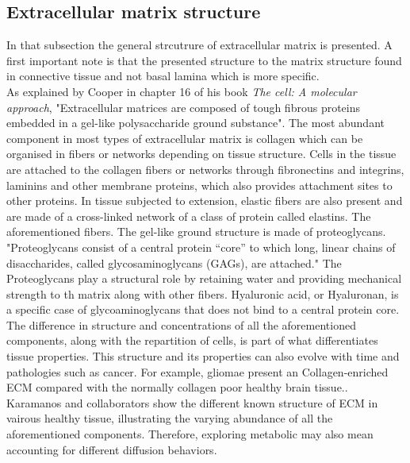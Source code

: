 \documentclass[11pt,a4paper]{article}
\begin{document}
\subsection{Extracellular matrix structure}
In that subsection the general strcutrure of extracellular matrix is presented. A first important note is that the presented structure to the matrix structure found in connective tissue and not basal lamina which is more specific.\\ 

As explained by Cooper in chapter 16 of his book \textit{The cell: A molecular approach}, "Extracellular matrices are composed of tough fibrous proteins embedded in a
gel-like polysaccharide ground substance"\cite{Cooper2006}. The most abundant component in most types of extracellular matrix is collagen which can be organised in fibers or networks depending on tissue structure. Cells in the tissue are attached to the collagen fibers or networks through fibronectins and integrins, laminins and other membrane proteins, which also provides attachment sites to other proteins. In tissue subjected to extension, elastic fibers are also present and are made of a cross-linked network of a class of protein called elastins. The aforementioned fibers. The gel-like ground structure is made of proteoglycans. "Proteoglycans consist of a central protein “core” to which long, linear chains of disaccharides, called glycosaminoglycans (GAGs), are attached."\cite{Lewin2013} The Proteoglycans play a structural role by retaining water and providing mechanical strength to th matrix along with other fibers. Hyaluronic acid, or Hyaluronan, is a specific case of glycoaminoglycans that does not bind to a central protein core.\\

The difference in structure and concentrations of all the aforementioned components, along with the repartition of cells, is part of what differentiates tissue properties. This structure and its properties can also evolve with time and pathologies such as cancer.\cite{Stewart2010} For example, gliomae present an Collagen-enriched ECM compared with the normally collagen poor healthy brain tissue.\cite{Marino2023}. Karamanos and collaborators show the different known structure of ECM in vairous healthy tissue, illustrating the varying abundance of all the aforementioned components.\cite{Karamanos2021} Therefore, exploring metabolic may also mean accounting for different diffusion behaviors.\\
\end{document}
